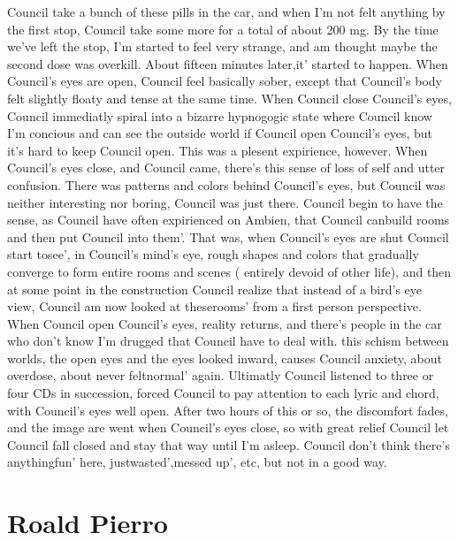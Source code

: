 \documentclass[12pt]{book}
\begin{document}
Council take a bunch of these pills in the car, and when I'm not felt anything by the first stop, Council take some more for a total of about 200 mg. By the time we've left the stop, I'm started to feel very strange, and am thought maybe the second dose was overkill. About fifteen minutes later,it' started to happen. When Council's eyes are open, Council feel basically sober, except that Council's body felt slightly floaty and tense at the same time. When Council close Council's eyes, Council immediatly spiral into a bizarre hypnogogic state where Council know I'm concious and can see the outside world if Council open Council's eyes, but it's hard to keep Council open. This was a plesent expirience, however. When Council's eyes close, and Council came, there's this sense of loss of self and utter confusion. There was patterns and colors behind Council's eyes, but Council was neither interesting nor boring, Council was just there. Council begin to have the sense, as Council have often expirienced on Ambien, that Council canbuild rooms and then put Council into them'. That was, when Council's eyes are shut Council start tosee', in Council's mind's eye, rough shapes and colors that gradually converge to form entire rooms and scenes ( entirely devoid of other life), and then at some point in the construction Council realize that instead of a bird's eye view, Council am now looked at theserooms' from a first person perspective. When Council open Council's eyes, reality returns, and there's people in the car who don't know I'm drugged that Council have to deal with. this schism between worlds, the open eyes and the eyes looked inward, causes Council anxiety, about overdose, about never feltnormal' again. Ultimatly Council listened to three or four CDs in succession, forced Council to pay attention to each lyric and chord, with Council's eyes well open. After two hours of this or so, the discomfort fades, and the image are went when Council's eyes close, so with great relief Council let Council fall closed and stay that way until I'm asleep. Council don't think there's anythingfun' here, justwasted',messed up', etc, but not in a good way.



\chapter{Roald Pierro}
\end{document}

